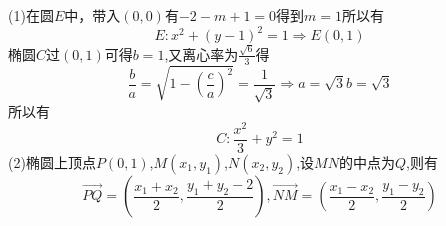 (1)在圆$E$中，带入$(0,0)$有$-2-m+1=0$得到$m=1$所以有
\begin{equation}
E:{x^2} + {\left( {y - 1} \right)^2} = 1 \Rightarrow E\left( {0,1} \right)
\end{equation}
椭圆$C$过$(0,1)$可得$b=1$,又离心率为$\frac{{\sqrt 6 }}{3}$得
\begin{equation}
\frac{b}{a} = \sqrt {1 - {{\left( {\frac{c}{a}} \right)}^2}}  = \frac{1}{{\sqrt 3 }} \Rightarrow a = \sqrt 3 b = \sqrt 3
\end{equation}
所以有
\begin{equation}
C:\frac{{{x^2}}}{3} + {y^2} = 1
\end{equation}
(2)椭圆上顶点$P(0,1)$,$M\left( {{x_1},{y_1}} \right)$,$N\left( {{x_2},{y_2}} \right)$,设$MN$的中点为$Q$,则有
\begin{equation}
\overrightarrow {PQ}  = \left( {\frac{{{x_1} + {x_2}}}{2},\frac{{{y_1} + {y_2} - 2}}{2}} \right),\overrightarrow {NM}  = \left( {\frac{{{x_1} - {x_2}}}{2},\frac{{{y_1} - {y_2}}}{2}} \right)
\end{equation}